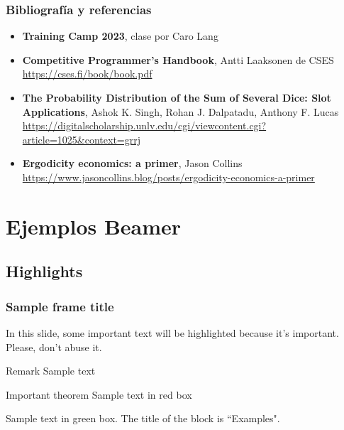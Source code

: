\documentclass{beamer}
\begin{document}
\begin{frame}
  \frametitle{Bibliografía y referencias}
  
  \begin{itemize}
  \item \textbf{Training Camp 2023}, clase por Caro Lang \\
  \item \textbf{Competitive Programmer's Handbook}, Antti Laaksonen de CSES \\
      \href{https://cses.fi/book/book.pdf}{https://cses.fi/book/book.pdf}
  \item \textbf{The Probability Distribution of the Sum of Several Dice: Slot Applications}, Ashok K. Singh, Rohan J. Dalpatadu, Anthony F. Lucas \\
      \href{https://digitalscholarship.unlv.edu/cgi/viewcontent.cgi?article=1025&context=grrj}{https://digitalscholarship.unlv.edu/cgi/viewcontent.cgi?article=1025\&context=grrj}
    \item \textbf{Ergodicity economics: a primer}, Jason Collins \\
      \href{https://www.jasoncollins.blog/posts/ergodicity-economics-a-primer}{https://www.jasoncollins.blog/posts/ergodicity-economics-a-primer}
  \end{itemize}
\end{frame}

\section{Ejemplos Beamer}

\subsection{Highlights}

\begin{frame}
  \frametitle{Sample frame title}

  In this slide, some important text will be
  \alert{highlighted} because it's important.
  Please, don't abuse it.

  \begin{block}{Remark}
  Sample text
  \end{block}

  \begin{alertblock}{Important theorem}
  Sample text in red box
  \end{alertblock}

  \begin{examples}
  Sample text in green box. The title of the block is ``Examples".
  \end{examples}
\end{frame}
\end{document}
